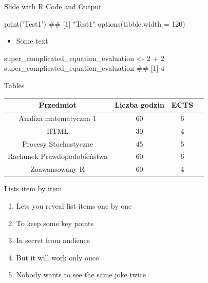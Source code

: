 \documentclass[
  ignorenonframetext,
]{beamer}
\newenvironment{Shaded}{}{}
\newcommand{\CommentTok}[1]{\textcolor[rgb]{0.00,0.50,0.00}{#1}}
\newcommand{\DataTypeTok}[1]{#1}
\newcommand{\DecValTok}[1]{#1}
\newcommand{\KeywordTok}[1]{\textcolor[rgb]{0.00,0.00,1.00}{#1}}
\newcommand{\NormalTok}[1]{#1}
\newcommand{\OperatorTok}[1]{#1}
\newcommand{\StringTok}[1]{\textcolor[rgb]{0.00,0.50,0.50}{#1}}
\providecommand{\tightlist}{%
  \setlength{\itemsep}{0pt}\setlength{\parskip}{0pt}}
\begin{document}
\begin{frame}[fragile]{Slide with R Code and Output}
\protect\hypertarget{slide-with-r-code-and-output}{}

\scriptsize

\begin{Shaded}
\begin{Highlighting}[]
\KeywordTok{print}\NormalTok{(}\StringTok{'Test1'}\NormalTok{)}
\CommentTok{## [1] "Test1"}
\KeywordTok{options}\NormalTok{(}\DataTypeTok{tibble.width =} \DecValTok{120}\NormalTok{)}
\end{Highlighting}
\end{Shaded}

\begin{itemize}
\tightlist
\item
  Some text
\end{itemize}

\scriptsize

\begin{Shaded}
\begin{Highlighting}[]
\NormalTok{super_complicated_equation_evaluation <-}\StringTok{ }\DecValTok{2} \OperatorTok{+}\StringTok{ }\DecValTok{2}
\NormalTok{super_complicated_equation_evaluation}
\CommentTok{## [1] 4}
\end{Highlighting}
\end{Shaded}

\end{frame}

\begin{frame}{Tables}
\protect\hypertarget{tables}{}

\begin{longtable}[]{@{}cccc@{}}
\toprule
Przedmiot & Liczba godzin & ECTS &\tabularnewline
\midrule
\endhead
Analiza matematyczna 1 & 60 & 6 &\tabularnewline
HTML & 30 & 4 &\tabularnewline
Procesy Stochastyczne & 45 & 5 &\tabularnewline
Rachunek Prawdopodobieństwa & 60 & 6 &\tabularnewline
Zaawansowany R & 60 & 4 &\tabularnewline
\bottomrule
\end{longtable}

\end{frame}

\begin{frame}{Lists item by item}
\protect\hypertarget{lists-item-by-item}{}

\begin{enumerate}[<+->]
\tightlist
\item
  Lets you reveal list items one by one
\item
  To keep some key points
\item
  In secret from audience
\item
  But it will work only once
\item
  Nobody wants to see the same joke twice
\end{enumerate}

\end{frame}
\end{document}
